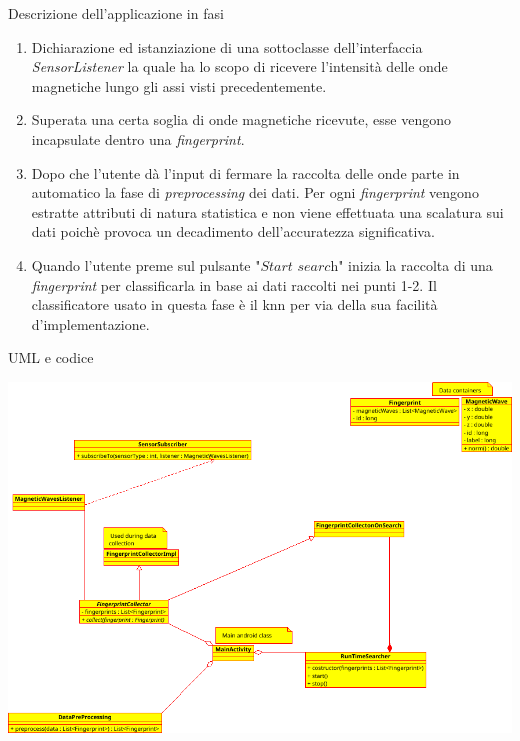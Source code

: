 \documentclass[11pt]{beamer}
\begin{document}
	\begin{frame}{Descrizione dell'applicazione in fasi}
		\begin{enumerate}
			\item Dichiarazione ed istanziazione di una sottoclasse dell'interfaccia \textit{SensorListener} la quale ha lo scopo di ricevere l'intensit\`a delle onde magnetiche lungo gli assi visti precedentemente.
			\item Superata una certa soglia di onde magnetiche ricevute, esse vengono incapsulate dentro una \textit{fingerprint}.
			\item Dopo che l'utente d\`a l'input di fermare la raccolta delle onde parte in automatico la fase di \textit{preprocessing} dei dati. Per ogni \textit{fingerprint} vengono estratte attributi di natura statistica e non viene effettuata una scalatura sui dati poich\`e provoca un decadimento dell'accuratezza significativa.
			\item Quando l'utente preme sul pulsante "$\textit{Start search}$" inizia la raccolta di una \textit{fingerprint} per classificarla in base ai dati raccolti nei punti 1-2. Il classificatore usato in questa fase \`e il knn per via della sua facilit\`a d'implementazione.
		\end{enumerate}
	\end{frame}
	\begin{frame}{UML e codice}
		\begin{center}
				\includegraphics[width=1\linewidth]{img/class_diagram}
		\end{center}
	\end{frame}
\end{document}
